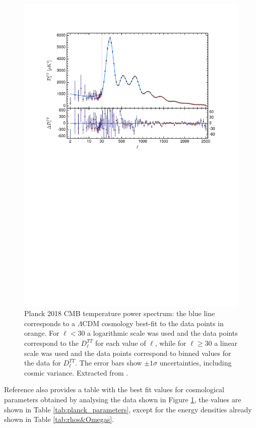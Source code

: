 \documentclass[openany,a4paper,12pt,oneside]{book}
\begin{document}
\begin{spacing}{1.5}
\begin{figure}[!htb]
    \centering
    \includegraphics[width=.9\linewidth]{Imagens/planck_spectrum.pdf}
    \caption{Planck 2018 CMB temperature power spectrum: the blue line corresponds to a $\Lambda$CDM cosmology best-fit to the data points in orange. For $\ell<30$ a logarithmic scale was used and the data points correspond to the $D_\ell^{TT}$ for each value of $\ell$, while for $\ell\ge 30$ a linear scale was used and the data points correspond to binned values for the data for $D_{\ell}^{TT}$. The error bars show $\pm 1\sigma$ uncertainties, including cosmic variance. Extracted from \cite{Planck_results}.}
    \label{fig:Planck_spectrum}
\end{figure} 

Reference \cite{Planck_results} also provides a table with the best fit values for cosmological parameters obtained by analysing the data shown in Figure \ref{fig:Planck_spectrum}, the values are shown in Table \ref{tab:planck_parameters}, except for the energy densities already shown in Table \ref{tab:rhos&Omegas}.  


\end{spacing}
\end{document}

